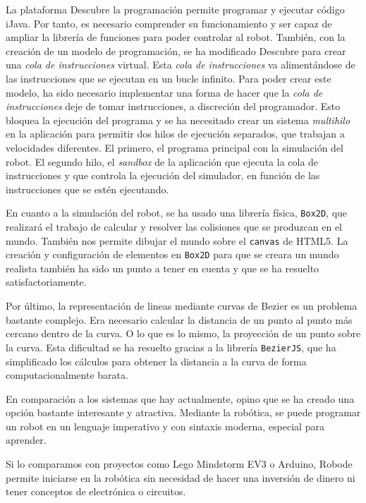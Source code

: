 La plataforma Descubre la programación permite programar y ejecutar código iJava. Por tanto, es necesario comprender su funcionamiento y ser capaz de ampliar la librería de funciones para poder controlar al robot. También, con la creación de un modelo de programación, se ha modificado Descubre para crear una \emph{cola de instrucciones} virtual. Esta \emph{cola de instrucciones} va alimentándose de las instrucciones que se ejecutan en un bucle infinito. Para poder crear este modelo, ha sido necesario implementar una forma de hacer que la \emph{cola de instrucciones} deje de tomar instrucciones, a discreción del programador. Esto bloquea la ejecución del programa y se ha necesitado crear un sistema \emph{multihilo} en la aplicación para permitir dos hilos de ejecución separados, que trabajan a velocidades diferentes. El primero, el programa principal con la simulación del robot. El segundo hilo, el \emph{sandbox} de la aplicación que ejecuta la cola de instrucciones y que controla la ejecución del simulador, en función de las instrucciones que se estén ejecutando. 

En cuanto a la simulación del robot, se ha usado una librería física, \texttt{Box2D}, que realizará el trabajo de calcular y resolver las colisiones que se produzcan en el mundo. También nos permite dibujar el mundo sobre el \texttt{canvas} de HTML5. La creación y configuración de elementos en \texttt{Box2D} para que se creara un mundo realista también ha sido un punto a tener en cuenta y que se ha resuelto satisfactoriamente. 

Por último, la representación de lineas mediante curvas de Bezier es un problema bastante complejo. Era necesario calcular la distancia de un punto al punto más cercano dentro de la curva. O lo que es lo mismo, la proyección de un punto sobre la curva. Esta dificultad se ha resuelto gracias a la librería \texttt{BezierJS}, que ha simplificado los cálculos para obtener la distancia a la curva de forma computacionalmente barata. 


En comparación a los sistemas que hay actualmente, {\color{red}opino} que se ha creado una opción bastante interesante y atractiva. Mediante la robótica, se puede programar un robot en un lenguaje imperativo y con sintaxis moderna, especial para aprender. 

Si lo comparamos con proyectos como Lego Mindstorm EV3 o Arduino, Robode permite iniciarse en la robótica sin necesidad de hacer una inversión de dinero ni tener conceptos de electrónica o circuitos.

